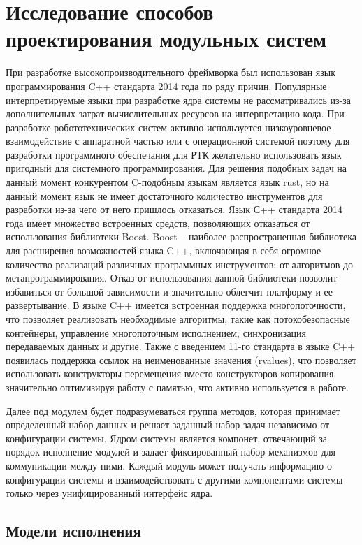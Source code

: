 \section{Исследование способов проектирования модульных систем}

При разработке высокопроизводительного фреймворка был использован язык программирования C++ стандарта 2014 года по ряду причин. Популярные интерпретируемые языки при разработке ядра системы не рассматривались из-за дополнительных затрат вычислительных ресурсов на интерпретацию кода. При разработке робототехнических систем активно используется низкоуровневое взаимодействие с аппаратной частью или с операционной системой поэтому для разработки программного обеспечания для РТК желательно использовать язык пригодный для системного программирования. Для решения подобных задач на данный момент конкурентом C-подобным языкам является язык rust, но на данный момент язык не имеет достаточного количество инструментов для разработки из-за чего от него пришлось отказаться. Язык С++ стандарта 2014 года имеет множество встроенных средств, позволяющих отказаться от использования библиотеки Boost. Boost – наиболее распространенная библиотека для расширения возможностей языка C++, включающая в себя огромное количество реализаций различных программных инструментов: от алгоритмов до метапрограммирования. Отказ от использования данной библиотеки позволит избавиться от большой зависимости и значительно облегчит платформу и ее развертывание. В языке C++ имеется встроенная поддержка многопоточности, что позволяет реализовать необходимые алгоритмы, такие как потокобезопасные контейнеры, управление многопоточным исполнением, синхронизация передаваемых данных и другие. Также с введением 11-го стандарта в языке C++ появилась поддержка ссылок на неименованные значения (rvalues), что позволяет использовать конструкторы перемещения вместо конструкторов копирования, значительно оптимизируя работу с памятью, что активно используется в работе.

Далее под модулем будет подразумеваться группа методов, которая принимает определенный набор данных и решает заданный набор задач независимо от конфигурации системы. Ядром системы является компонет, отвечающий за порядок исполнение модулей и задает фиксированный набор механизмов для коммуникации между ними. Каждый модуль может получать информацию о конфигурации системы и взаимодействовать с другими компонентами системы только через унифицированный интерфейс ядра.

\subsection{Модели исполнения}

